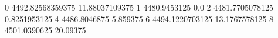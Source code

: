 0 4492.82568359375 11.88037109375
1 4480.9453125 0.0
2 4481.7705078125 0.8251953125
4 4486.8046875 5.859375
6 4494.1220703125 13.1767578125
8 4501.0390625 20.09375
